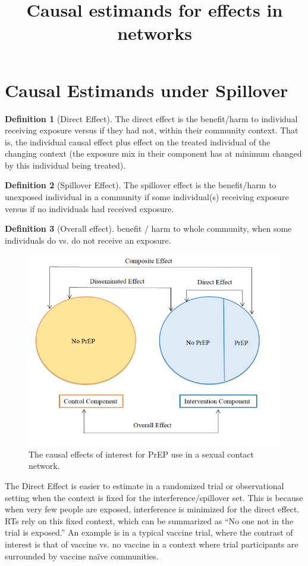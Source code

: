 \documentclass{article}
\title{Causal estimands for effects in networks}
\author{}
\date{}
\theoremstyle{definition}
\newtheorem{definition}{Definition}[section]
\begin{document}
\maketitle

\section{Causal Estimands under Spillover}
\begin{definition}[Direct Effect]The direct effect is the benefit/harm to individual receiving exposure versus if they had not, within their community context. That is, the individual causal effect plus effect on the treated individual of the changing context (the exposure mix in their component has at minimum changed by this individual being treated).
\end{definition}
\begin{definition}[Spillover Effect] The spillover effect is the benefit/harm to unexposed individual in a community if some individual(s) receiving exposure versus if no individuals had received exposure.
\end{definition}
\begin{definition}[Overall effect]benefit / harm to whole community, when some individuals do vs. do not receive an exposure.
\end{definition}

\begin{figure}[H]
    \centering
    \includegraphics{figure1.png}
    \caption{The causal effects of interest for PrEP use in a sexual contact network.}
    \label{fig:1}
\end{figure}
The Direct Effect is easier to estimate in a randomized trial or observational setting when the context is fixed for the interference/spillover set. This is because when very few people are exposed, interference is minimized for the direct effect. RTs rely on this fixed context, which can be summarized as ``No one not in the trial is exposed.'' An example is in a typical vaccine trial, where the contrast of interest is that of vaccine vs. no vaccine in a context where trial participants are surrounded by vaccine naïve communities.
\end{document}
